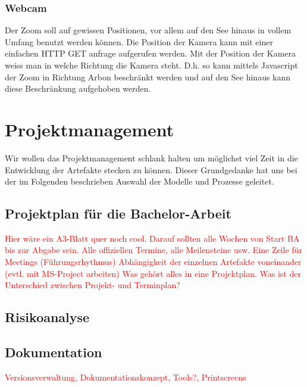 \documentclass[a4paper,ngerman, 11pt, pagesize]{report}
\newcommand\Diskussionspunkt[1]{\textcolor{red}{#1}}
\begin{document}
\subsection{Webcam}
Der Zoom soll auf gewissen Positionen, vor allem auf den See hinaus in vollem Umfang benutzt werden können. Die Position der Kamera kann mit einer einfachen HTTP GET anfrage aufgerufen werden. Mit der Position der Kamera weiss man in welche Richtung die Kamera steht. D.h. so kann mittels Javascript der Zoom in Richtung Arbon beschränkt werden und auf den See hinaus kann diese Beschränkung aufgehoben werden.

   


\chapter{Projektmanagement}
Wir wollen das Projektmanagement schlank halten um möglichst viel Zeit in die Entwicklung der Artefakte stecken zu können.
Dieser Grundgedanke hat uns bei der im Folgenden beschrieben Auswahl der Modelle und Prozesse geleitet.



\section{Projektplan für die Bachelor-Arbeit}
\Diskussionspunkt{Hier wäre ein A3-Blatt quer noch cool. Darauf sollten alle Wochen von Start BA bis zur Abgabe sein.
Alle offiziellen Termine, alle Meilensteine usw.
Eine Zeile für Meetings (Führungsrhythmus)
Abhängigkeit der einzelnen Artefakte voneinander (evtl. mit MS-Project arbeiten)
Was gehört alles in eine Projektplan. Was ist der Unterschied zwischen Projekt- und Terminplan?}


\section{Risikoanalyse}
   


\section{Dokumentation}
\Diskussionspunkt{Versionsverwaltung, Dokumentationskonzept, Tools?, Printscreens}
\end{document}
